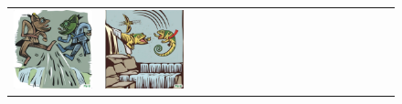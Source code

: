 \begin{figure}[ht!]
\begin{adjustwidth}{-0.8in}{-0.5in}
\begin{tabular}{cccccccccccccccccccc}
\multicolumn{2}{c}{\includegraphics[width=\threebythreecolwidth\textwidth]{figures/cherries/chameleon_0.jpg}} &
\multicolumn{2}{c}{\includegraphics[width=\threebythreecolwidth\textwidth]{figures/cherries/chameleon_1.jpg}} &

\end{tabular}
\end{adjustwidth}
\end{figure}
